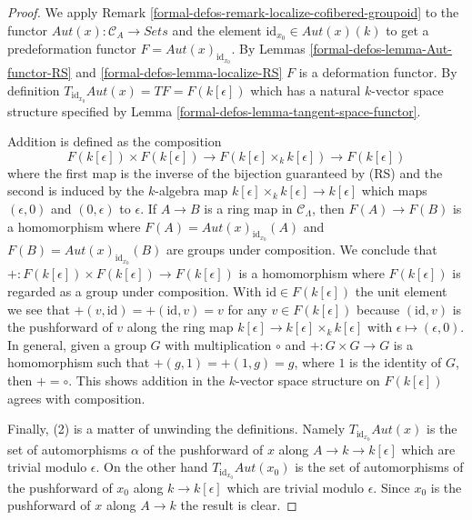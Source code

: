 \begin{proof}
We apply
Remark \ref{formal-defos-remark-localize-cofibered-groupoid}
to the functor $\mathit{Aut}(x) : \mathcal{C}_A \to \textit{Sets}$
and the element $\text{id}_{x_0} \in \mathit{Aut}(x)(k)$ to get
a predeformation functor $F = \mathit{Aut}(x)_{\text{id}_{x_0}}$. By
Lemmas \ref{formal-defos-lemma-Aut-functor-RS} and \ref{formal-defos-lemma-localize-RS}
$F$ is a deformation functor. By definition
$T_{\text{id}_{x_0}} \mathit{Aut}(x) = TF = F(k[\epsilon])$
which has a natural
$k$-vector space structure specified by Lemma
\ref{formal-defos-lemma-tangent-space-functor}.

\medskip\noindent
Addition is defined as the composition
$$
F(k[\epsilon]) \times F(k[\epsilon]) \longrightarrow
F(k[\epsilon] \times_k k[\epsilon]) \longrightarrow
F(k[\epsilon])
$$
where the first map is the inverse of the bijection guaranteed by (RS) and the
second is induced by the $k$-algebra map
$k[\epsilon] \times_k k[\epsilon] \to k[\epsilon]$
which maps $(\epsilon, 0)$ and $(0, \epsilon)$ to $\epsilon$.
If $A \to B$ is a ring map in $\mathcal{C}_\Lambda$, then $F(A) \to F(B)$
is a homomorphism where $F(A) = \mathit{Aut}(x)_{\text{id}_{x_0}}(A)$ and
$F(B) = \mathit{Aut}(x)_{\text{id}_{x_0}}(B)$ are groups under
composition. We conclude that
$+ : F(k[\epsilon]) \times F(k[\epsilon])\to F(k[\epsilon])$
is a homomorphism where $F(k[\epsilon])$ is regarded as a
group under composition. With $\text{id} \in F(k[\epsilon])$ the
unit element we see that $+(v, \text{id}) =
+(\text{id}, v) = v$ for any $v \in F(k[\epsilon])$ because
$(\text{id}, v)$ is the pushforward of $v$ along the ring map
$k[\epsilon] \to k[\epsilon] \times_k k[\epsilon]$ with
$\epsilon \mapsto (\epsilon, 0)$.
In general, given a group $G$ with multiplication $\circ$
and $+ : G \times G \to G$ is a homomorphism such that
$+(g, 1) = +(1, g) = g$, where $1$ is the identity of $G$, then $+ = \circ$.
This shows addition in the $k$-vector space structure on $F(k[\epsilon])$
agrees with composition.

\medskip\noindent
Finally, (2) is a matter of unwinding the definitions. Namely
$T_{\text{id}_{x_0}} \mathit{Aut}(x)$ is the set of
automorphisms $\alpha$ of the pushforward of $x$ along
$A \to k \to k[\epsilon]$ which are trivial modulo $\epsilon$.
On the other hand $T_{\text{id}_{x_0}} \mathit{Aut}(x_0)$ is the set of
automorphisms of the pushforward of $x_0$ along
$k \to k[\epsilon]$ which are trivial modulo $\epsilon$.
Since $x_0$ is the pushforward of $x$ along $A \to k$ the result
is clear.
\end{proof}

